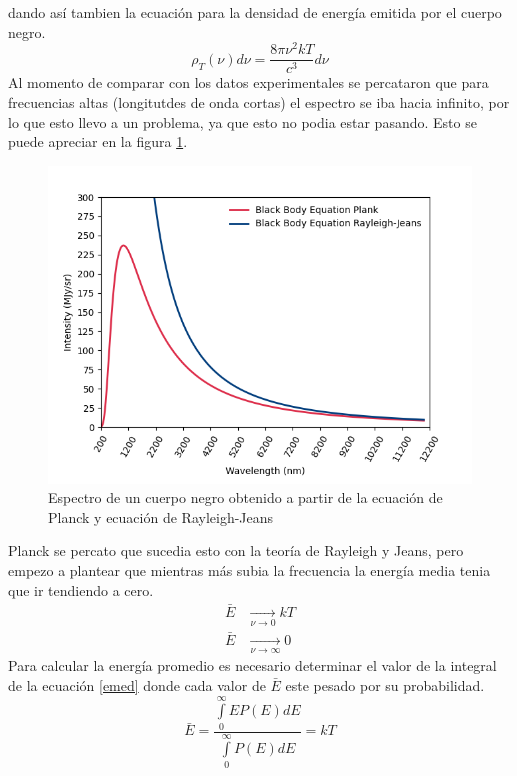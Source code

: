 \documentclass[12pt,letterpaper]{article}
\begin{document}
\begin{multicols}{2}
\begin{equation}
\end{equation}
dando así tambien la ecuación para la densidad de energía emitida por el cuerpo negro. 
\begin{equation}
    \rho_T(\nu) d\nu = \frac{8\pi \nu^2 k T}{c^3} d\nu 
\end{equation}
Al momento de comparar con los datos experimentales se percataron que para frecuencias altas (longitutdes de onda cortas) el espectro se iba hacia infinito, por lo que esto llevo a un problema, ya que esto no podia estar pasando. Esto se puede apreciar en la figura \ref{teovsexp}.
\begin{figure}[H]
\includegraphics[scale=0.5]{../Graphics/exp_vs_teo.png}
\caption{Espectro de un cuerpo negro obtenido a partir de la ecuación de Planck y ecuación de Rayleigh-Jeans}
\label{teovsexp}
\end{figure}
Planck se percato que sucedia esto con la teoría de Rayleigh y Jeans, pero empezo a plantear que mientras más subia la frecuencia la energía media tenia que ir tendiendo a cero. 
\begin{align*}
    \bar{E} &\xrightarrow[\nu \rightarrow 0]{} kT \\
    \bar{E} &\xrightarrow[\nu \rightarrow \infty]{} 0 
\end{align*}
Para calcular la energía promedio es necesario determinar el valor de la integral de la ecuación \ref{emed} donde cada valor de $\bar{E}$ este pesado por su probabilidad.
\begin{equation}
    \bar{E}= \frac{\int\limits_0^\infty EP(E)dE}{\int\limits_0^\infty P(E)dE} = kT
    \label{emed}
\end{equation}

\end{multicols}
\end{document}
